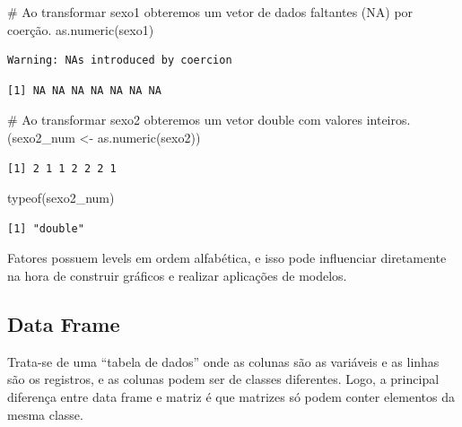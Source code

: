 \documentclass[
  letterpaper,
  DIV=11,
  numbers=noendperiod]{scrreprt}
\newenvironment{Shaded}{\begin{snugshade}}{\end{snugshade}}
\newcommand{\CommentTok}[1]{\textcolor[rgb]{0.37,0.37,0.37}{#1}}
\newcommand{\FunctionTok}[1]{\textcolor[rgb]{0.28,0.35,0.67}{#1}}
\newcommand{\NormalTok}[1]{\textcolor[rgb]{0.00,0.23,0.31}{#1}}
\newcommand{\OtherTok}[1]{\textcolor[rgb]{0.00,0.23,0.31}{#1}}
\begin{document}
\begin{Shaded}
\begin{Highlighting}[]
\CommentTok{\# Ao transformar sexo1 obteremos um vetor de dados faltantes (NA) por coerção.}
\FunctionTok{as.numeric}\NormalTok{(sexo1)}
\end{Highlighting}
\end{Shaded}

\begin{verbatim}
Warning: NAs introduced by coercion
\end{verbatim}

\begin{verbatim}
[1] NA NA NA NA NA NA NA
\end{verbatim}

\begin{Shaded}
\begin{Highlighting}[]
\CommentTok{\# Ao transformar sexo2 obteremos um vetor double com valores inteiros.}
\NormalTok{(sexo2\_num }\OtherTok{\textless{}{-}} \FunctionTok{as.numeric}\NormalTok{(sexo2))}
\end{Highlighting}
\end{Shaded}

\begin{verbatim}
[1] 2 1 1 2 2 2 1
\end{verbatim}

\begin{Shaded}
\begin{Highlighting}[]
\FunctionTok{typeof}\NormalTok{(sexo2\_num)}
\end{Highlighting}
\end{Shaded}

\begin{verbatim}
[1] "double"
\end{verbatim}

Fatores possuem levels em ordem alfabética, e isso pode influenciar
diretamente na hora de construir gráficos e realizar aplicações de
modelos.

\hypertarget{data-frame}{%
\subsection{Data Frame}\label{data-frame}}

Trata-se de uma ``tabela de dados'' onde as colunas são as variáveis e
as linhas são os registros, e as colunas podem ser de classes
diferentes. Logo, a principal diferença entre data frame e matriz é que
matrizes só podem conter elementos da mesma classe.
\end{document}
